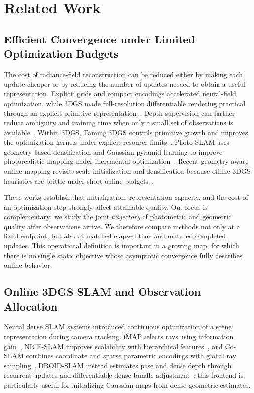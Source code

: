 \section{Related Work}
\label{sec:related_work}

\subsection{Efficient Convergence under Limited Optimization Budgets}
The cost of radiance-field reconstruction can be reduced either by making each
update cheaper or by reducing the number of updates needed to obtain a useful
representation. Explicit grids and compact encodings accelerated neural-field
optimization, while 3DGS made full-resolution differentiable rendering
practical through an explicit primitive representation~\cite{kerbl20233dgs}.
Depth supervision can further reduce ambiguity and training time when only a
small set of observations is available~\cite{deng2022dsnerf}. Within 3DGS,
Taming 3DGS controls primitive growth and improves the optimization kernels
under explicit resource limits~\cite{mallick2024taming3dgs}. Photo-SLAM uses
geometry-based densification and Gaussian-pyramid learning to improve
photorealistic mapping under incremental optimization~\cite{huang2024photoslam}.
Recent geometry-aware online mapping revisits scale initialization and
densification because offline 3DGS heuristics are brittle under short online
budgets~\cite{geometryOnline2026}.

These works establish that initialization, representation capacity, and the
cost of an optimization step strongly affect attainable quality. Our focus is
complementary: we study the joint \emph{trajectory} of photometric and
geometric quality after observations arrive. We therefore compare methods not
only at a fixed endpoint, but also at matched elapsed time and matched completed
updates. This operational definition is important in a growing map, for which
there is no single static objective whose asymptotic convergence fully
describes online behavior.

\subsection{Online 3DGS SLAM and Observation Allocation}
Neural dense SLAM systems introduced continuous optimization of a scene
representation during camera tracking. iMAP selects rays using information
gain~\cite{sucar2021imap}, NICE-SLAM improves scalability with hierarchical
features~\cite{zhu2022nice}, and Co-SLAM combines coordinate and sparse
parametric encodings with global ray sampling~\cite{wang2023coslam}.
DROID-SLAM instead estimates pose and dense depth through recurrent updates and
differentiable dense bundle adjustment~\cite{teed2021droid}; this frontend is
particularly useful for initializing Gaussian maps from dense geometric
estimates.


